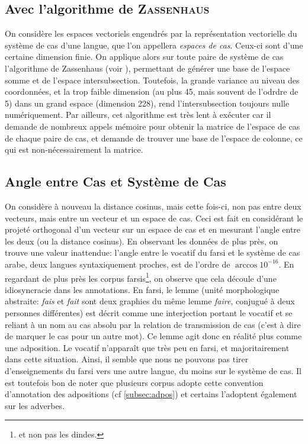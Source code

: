 \documentclass{cours}
\begin{document}
\subsection{Avec l'algorithme de \textsc{Zassenhaus}}\label{subsec:zassenhaus}
On considère les espaces vectoriels engendrés par la représentation vectorielle du système de cas d'une langue, que l'on appellera \textit{espaces de cas}.
Ceux-ci sont d'une certaine dimension finie.
On applique alors sur toute paire de système de cas l'algorithme de Zassenhaus (voir \cite{zassenhaus}), permettant de générer une base de l'espace somme et de l'espace intersubsection.
Toutefois, la grande variance au niveau des coordonnées, et la trop faible dimension (au plus 45, mais souvent de l'odrdre de 5) dans un grand espace (dimension 228), rend l'intersubsection toujours nulle numériquement.
Par ailleurs, cet algorithme est très lent à exécuter car il demande de nombreux appels mémoire pour obtenir la matrice de l'espace de cas de chaque paire de cas, et demande de trouver une base de l'espace de colonne, ce qui est non-nécessairement la matrice.

\subsection{Angle entre Cas et Système de Cas}\label{subsec:projection}
On considère à nouveau la distance cosinus, mais cette fois-ci, non pas entre deux vecteurs, mais entre un vecteur et un espace de cas.
Ceci est fait en considérant le projeté orthogonal d'un vecteur sur un espace de cas et en mesurant l'angle entre les deux (ou la distance cosinus).
En observant les données de plus près, on trouve une valeur inattendue: l'angle entre le vocatif du farsi et le système de cas arabe, deux langues syntaxiquement proches, est de l'ordre de $\arccos{10^{-16}}$.
En regardant de plus près les corpus farsis\footnote{et non pas les dindes.}, on observe que cela découle d'une idiosyncracie dans les annotations.
En farsi, le lemme (unité morphologique abstraite: \textsl{fais} et \textsl{fait} sont deux graphies du même lemme \textsl{faire}, conjugué à deux personnes différentes)\label{farsi}
est décrit comme une interjection portant le vocatif et se reliant à un nom au cas absolu par la relation de transmission de cas (c'est à dire de marquer le cas pour un autre mot).
Ce lemme agit donc en réalité plus comme une adposition.
Le vocatif n'apparaît que très peu en farsi, et majoritairement dans cette situation.
Ainsi, il semble que nous ne pouvons pas tirer d'enseignements du farsi vers une autre langue, du moins sur le système de cas.
Il est toutefois bon de noter que plusieurs corpus adopte cette convention d'annotation des adpositions (cf \ref{subsec:adpos}) et certains l'adoptent également sur les adverbes.\\
\end{document}

